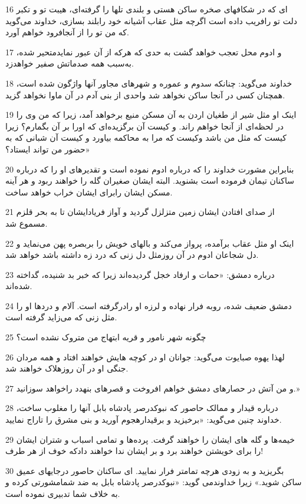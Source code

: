 \par 16 ‌ای که در شکافهای صخره ساکن هستی و بلندی تلها را گرفته‌ای، هیبت تو و تکبر دلت تو رافریب داده است اگر‌چه مثل عقاب آشیانه خود رابلند بسازی، خداوند می‌گوید که من تو را از آنجافرود خواهم آورد.
\par 17 و ادوم محل تعجب خواهد گشت به حدی که هرکه از آن عبور نمایدمتحیر شده، به‌سبب همه صدماتش صفیر خواهدزد.
\par 18 خداوند می‌گوید: چنانکه سدوم و عموره و شهرهای مجاور آنها واژگون شده است، همچنان کسی در آنجا ساکن نخواهد شد واحدی از بنی آدم در آن ماوا نخواهد گزید.
\par 19 اینک او مثل شیر از طغیان اردن به آن مسکن منیع برخواهد آمد، زیرا که من وی را در لحظه‌ای از آنجا خواهم راند. و کیست آن برگزیده‌ای که اورا بر آن بگمارم؟ زیرا کیست که مثل من باشد وکیست که مرا به محاکمه بیاورد و کیست آن شبانی که به حضور من تواند ایستاد؟»
\par 20 بنابراین مشورت خداوند را که درباره ادوم نموده است و تقدیرهای او را که درباره ساکنان تیمان فرموده است بشنوید. البته ایشان صغیران گله را خواهند ربود و هر آینه مسکن ایشان رابرای ایشان خراب خواهد ساخت.
\par 21 از صدای افتادن ایشان زمین متزلزل گردید و آواز فریادایشان تا به بحر قلزم مسموع شد.
\par 22 اینک او مثل عقاب برآمده، پرواز می‌کند و بالهای خویش را بربصره پهن می‌نماید و دل شجاعان ادوم در آن روزمثل دل زنی که درد زه داشته باشد خواهد شد.
\par 23 درباره دمشق: «حمات و ارفاد خجل گردیده‌اند زیرا که خبر بد شنیده، گداخته شده‌اند.
\par 24 دمشق ضعیف شده، روبه فرار نهاده و لرزه او رادرگرفته است. آلام و دردها او را مثل زنی که می‌زاید گرفته است.
\par 25 چگونه شهر نامور و قریه ابتهاج من متروک نشده است؟
\par 26 لهذا یهوه صبایوت می‌گوید: جوانان او در کوچه هایش خواهند افتاد و همه مردان جنگی او در آن روزهلاک خواهند شد.
\par 27 و من آتش در حصارهای دمشق خواهم افروخت و قصرهای بنهدد راخواهد سوزانید.»
\par 28 درباره قیدار و ممالک حاصور که نبوکدرصر پادشاه بابل آنها را مغلوب ساخت، خداوند چنین می‌گوید: «برخیزید و برقیدارهجوم آورید و بنی مشرق را تاراج نمایید.
\par 29 خیمه‌ها و گله های ایشان را خواهند گرفت. پرده‌ها و تمامی اسباب و شتران ایشان را برای خویشتن خواهند برد و بر ایشان ندا خواهند دادکه خوف از هر طرف!
\par 30 بگریزید و به زودی هرچه تمامتر فرار نمایید. ای ساکنان حاصور درجایهای عمیق ساکن شوید.» زیرا خداوندمی گوید: «نبوکدرصر پادشاه بابل به ضد شمامشورتی کرده و به خلاف شما تدبیری نموده است.
